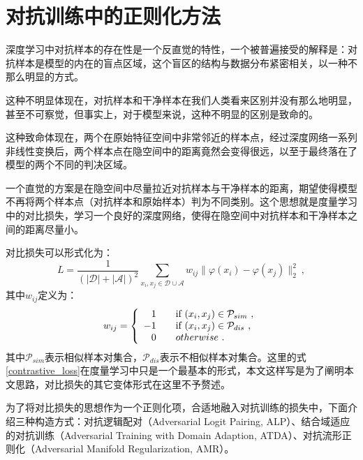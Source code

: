 \chapter{对抗训练中的正则化方法}

深度学习中对抗样本的存在性是一个反直觉的特性，一个被普遍接受的解释是：对抗样本是模型的内在的盲点区域，这个盲区的结构与数据分布紧密相关，以一种不那么明显的方式\cite{szegedy2013intriguing}。

这种不明显体现在，对抗样本和干净样本在我们人类看来区别并没有那么地明显，甚至不可察觉，但事实上，对于模型来说，这种不明显的区别是致命的。

这种致命体现在，两个在原始特征空间中非常邻近的样本点，经过深度网络一系列非线性变换后，两个样本点在隐空间中的距离竟然会变得很远，以至于最终落在了模型的两个不同的判决区域。

一个直觉的方案是在隐空间中尽量拉近对抗样本与干净样本的距离，期望使得模型不再将两个样本点（对抗样本和原始样本）判为不同类别。这个思想就是度量学习中的对比损失，学习一个良好的深度网络，使得在隐空间中对抗样本和干净样本之间的距离尽量小。

对比损失可以形式化为：
\begin{equation}
    L
    = 
    \frac{1}{(|\mathcal{D}| + |\mathcal{A}|)^2} \sum_{x_i, x_j \in \mathcal{D} \cup \mathcal{A}} w_{ij}\big\|\varphi(x_i) - \varphi(x_j)\big\|_2^2
    \ ,
    \label{contrastive_loss}
\end{equation}
其中$w_{ij}$定义为：
\begin{equation}
    w_{ij} = \left\{
    \begin{array}{rl}
    1  & \quad \textnormal{if } (x_i, x_j) \in \mathcal{P}_{sim} \ ,\\
    -1 & \quad \textnormal{if } (x_i, x_j) \in \mathcal{P}_{dis} \ ,\\
    0  & \quad otherwise \ .
    \end{array} \right.
    \label{metric_weight}
\end{equation}
其中$\mathcal{P}_{sim}$表示相似样本对集合，$\mathcal{P}_{dis}$表示不相似样本对集合。这里的式\eqref{contrastive_loss}在度量学习中只是一个最基本的形式，本文这样写是为了阐明本文思路，对比损失的其它变体形式在这里不予赘述。

为了将对比损失的思想作为一个正则化项，合适地融入对抗训练的损失中，下面介绍三种构造方式：对抗逻辑配对（Adversarial Logit Pairing, ALP）\cite{kannan2018adversarial}、结合域适应的对抗训练（Adversarial Training with Domain Adaption, ATDA）\cite{song2018improving}、对抗流形正则化（Adversarial Manifold Regularization, AMR）。


